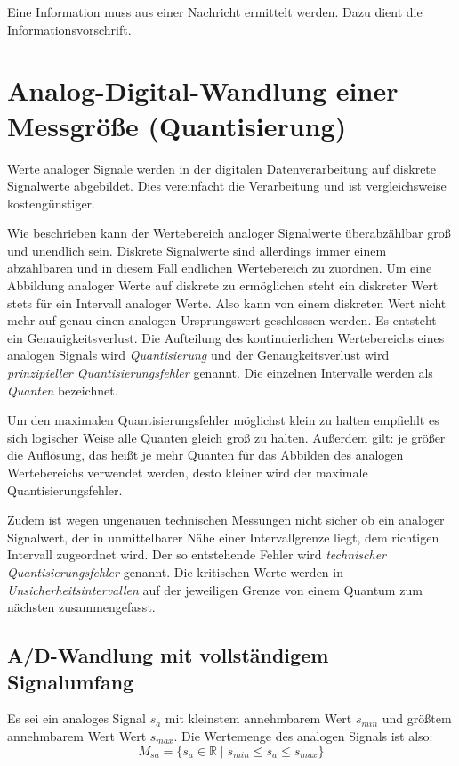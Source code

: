 \documentclass[11pt,a4paper]{scrreprt}
\begin{document}
Eine Information muss aus einer Nachricht ermittelt werden. Dazu dient die Informationsvorschrift.

\section{Analog-Digital-Wandlung einer Messgröße (Quantisierung)}
Werte analoger Signale werden in der digitalen Datenverarbeitung auf diskrete Signalwerte abgebildet. Dies vereinfacht die Verarbeitung und ist vergleichsweise kostengünstiger. 

Wie beschrieben kann der Wertebereich analoger Signalwerte überabzählbar groß und unendlich sein. Diskrete Signalwerte sind allerdings immer einem abzählbaren und in diesem Fall endlichen Wertebereich zu zuordnen. Um eine Abbildung analoger Werte auf diskrete zu ermöglichen steht ein diskreter Wert stets für ein Intervall analoger Werte. Also kann von einem diskreten Wert nicht mehr auf genau einen analogen Ursprungswert geschlossen werden. Es entsteht ein Genauigkeitsverlust. Die Aufteilung des kontinuierlichen Wertebereichs eines analogen Signals wird \textsl{Quantisierung} und der Genaugkeitsverlust wird \textsl{prinzipieller Quantisierungsfehler} genannt. Die einzelnen Intervalle werden als \textsl{Quanten} bezeichnet. 

Um den maximalen Quantisierungsfehler möglichst klein zu halten empfiehlt es sich logischer Weise alle Quanten gleich groß zu halten. Außerdem gilt: je größer die Auflösung, das heißt je mehr Quanten für das Abbilden des analogen Wertebereichs verwendet werden, desto kleiner wird der maximale Quantisierungsfehler.

Zudem ist wegen ungenauen technischen Messungen nicht sicher ob ein analoger Signalwert, der in unmittelbarer Nähe einer Intervallgrenze liegt, dem richtigen Intervall zugeordnet wird. Der so entstehende Fehler wird \textsl{technischer Quantisierungsfehler} genannt. Die kritischen Werte werden in \textsl{Unsicherheitsintervallen} auf der jeweiligen Grenze von einem Quantum zum nächsten zusammengefasst.

\subsection{A/D-Wandlung mit vollständigem Signalumfang}
Es sei ein analoges Signal $s_a$ mit kleinstem annehmbarem Wert $s_{min}$ und größtem annehmbarem Wert Wert $s_{max}$. Die Wertemenge des analogen Signals ist also: 
\[ 
	M_{sa} =  \{ s_a \in \mathbb{R} \mid 
		s_{min} \le s_a \le s_{max} \} 
\]
\end{document}
